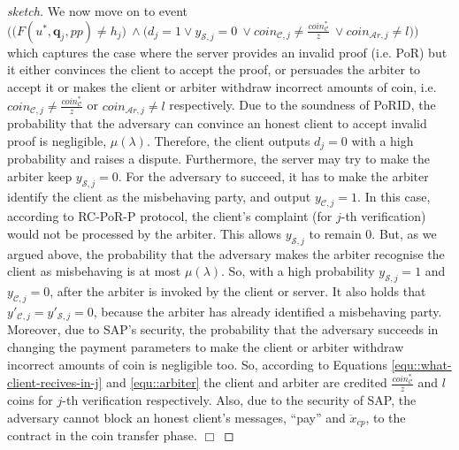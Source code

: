 \begin{proof}[sketch]
 
 We now move on to event  $\Big(\Big(F(u^{\scriptscriptstyle *}, \bm{q}_{\scriptscriptstyle j}, {pp})\neq h_{\scriptscriptstyle j}\Big) \ \wedge \Big(d_{\scriptscriptstyle j}=1	\vee y_{\scriptscriptstyle \mathcal {S},j}=0 \ \vee coin_{\scriptscriptstyle\mathcal{C},j}\neq \frac{coin_{\scriptscriptstyle\mathcal C}^{\scriptscriptstyle*}}{z} \ \vee  coin_{\scriptscriptstyle\mathcal{A}r,j}\neq l\Big)\Big)$  which captures the case where the server provides an invalid  proof (i.e. PoR) but it either convinces the client to accept the proof, or  persuades the arbiter to accept it  or makes the client or arbiter withdraw  incorrect amounts of coin, i.e.    $coin_{\scriptscriptstyle\mathcal{C},j}\neq \frac{coin_{\scriptscriptstyle\mathcal C}^{\scriptscriptstyle*}}{z}$ or $coin_{\scriptscriptstyle\mathcal{A}r,j}\neq l$ respectively.   Due to the soundness of PoRID, the probability that the adversary can convince an honest client to accept invalid proof is negligible, $\mu(\lambda)$. Therefore, the client outputs $d_{\scriptscriptstyle j}=0$  with a high probability and raises a dispute. Furthermore, the server may try to make the arbiter keep $y_{\scriptscriptstyle \mathcal {S},j}=0$. For the adversary to succeed, it has to make the arbiter  identify the client as the misbehaving party, and output $y_{\scriptscriptstyle \mathcal {C},j}=1$. In this case, according to RC-PoR-P protocol, the client's complaint (for $j$-th verification) would not be processed by the arbiter. This  allows   $y_{\scriptscriptstyle \mathcal {S},j}$ to remain $0$.   But, as we argued above, the probability that the adversary makes the arbiter  recognise the client as misbehaving is at most $\mu(\lambda)$. So, with a high probability  $y_{\scriptscriptstyle \mathcal {S},j}=1$ and $y_{\scriptscriptstyle \mathcal {C},j}=0$, after the arbiter  is invoked by the client or  server. It also holds that $y'_{\scriptscriptstyle \mathcal {C},j}=y'_{\scriptscriptstyle \mathcal {S},j}=0$, because  the arbiter has already identified a misbehaving party. Moreover, due to SAP's security, the probability that the adversary succeeds in changing the payment parameters to  make the client or arbiter withdraw  incorrect amounts of coin is negligible too.    So, according to Equations \ref{equ::what-client-recives-in-j} and \ref{equ::arbiter}  the client and arbiter are credited $\frac{coin_{\scriptscriptstyle\mathcal C}^{\scriptscriptstyle*}}{z}$ and $l$ coins for $j$-th verification respectively.   Also, due to the security of SAP, the adversary cannot block an honest client's  messages, ``pay'' and $\ddot{x}_{\scriptscriptstyle cp}$, to the contract in the coin transfer phase.
  \hfill\(\Box\)\end{proof}


